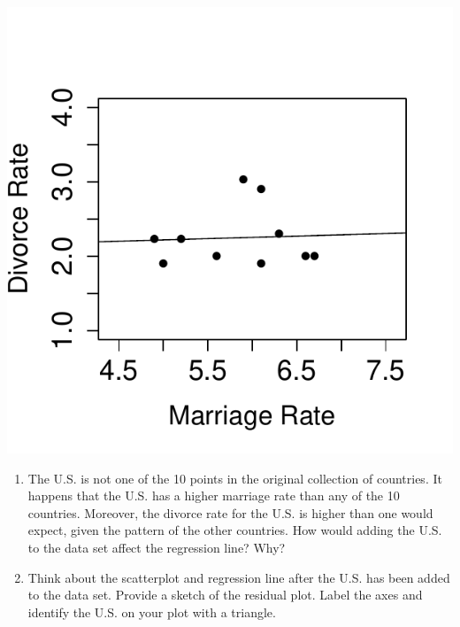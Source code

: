 \begin{marginfigure}


\centering


\includegraphics{includes/Item13_R.pdf}


\end{marginfigure}





\begin{enumerate}[leftmargin=1cm, itemsep=.2em]


\item The U.S. is not one of the 10 points in the original collection of countries. It happens that the U.S. has a higher marriage rate than any of the 10 countries. Moreover, the divorce rate for the U.S. is higher than one would expect, given the pattern of the other countries. How would adding the U.S. to the data set affect the regression line? Why?


\item Think about the scatterplot and regression line after the U.S. has been added to the data set. Provide a sketch of the residual plot. Label the axes and identify the U.S. on your plot with a triangle.


\end{enumerate}








